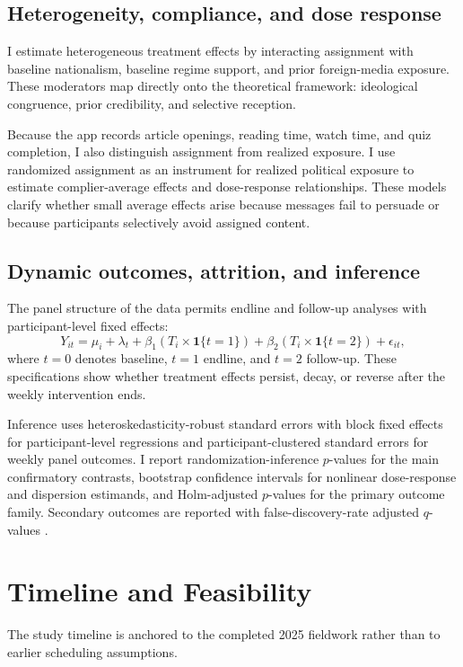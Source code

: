 \documentclass[12pt,american]{article}
\begin{document}
\subsection{Heterogeneity, compliance, and dose response}

I estimate heterogeneous treatment effects by interacting assignment with baseline nationalism, baseline regime support, and prior foreign-media exposure. These moderators map directly onto the theoretical framework: ideological congruence, prior credibility, and selective reception.

Because the app records article openings, reading time, watch time, and quiz completion, I also distinguish assignment from realized exposure. I use randomized assignment as an instrument for realized political exposure to estimate complier-average effects and dose-response relationships. These models clarify whether small average effects arise because messages fail to persuade or because participants selectively avoid assigned content.

\subsection{Dynamic outcomes, attrition, and inference}

The panel structure of the data permits endline and follow-up analyses with participant-level fixed effects:
\[
Y_{it}
=
\mu_i
+
\lambda_t
+
\beta_1(T_i\times\mathbf{1}\{t=1\})
+
\beta_2(T_i\times\mathbf{1}\{t=2\})
+
\epsilon_{it},
\]
where \(t=0\) denotes baseline, \(t=1\) endline, and \(t=2\) follow-up. These specifications show whether treatment effects persist, decay, or reverse after the weekly intervention ends.

Inference uses heteroskedasticity-robust standard errors with block fixed effects for participant-level regressions and participant-clustered standard errors for weekly panel outcomes. I report randomization-inference \(p\)-values for the main confirmatory contrasts, bootstrap confidence intervals for nonlinear dose-response and dispersion estimands, and Holm-adjusted \(p\)-values for the primary outcome family. Secondary outcomes are reported with false-discovery-rate adjusted \(q\)-values \citep{haalandrothwohlfart2023}.

\section{Timeline and Feasibility}

The study timeline is anchored to the completed 2025 fieldwork rather than to earlier scheduling assumptions.
\end{document}
